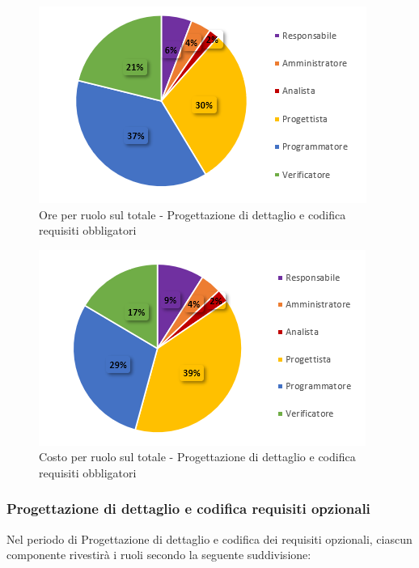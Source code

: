 \begin{figure}[H]
  \centering
  \includegraphics[scale=0.9]{immagini/ore_ruolo_reqObbligatori.png}
  \caption{Ore per ruolo sul totale - Progettazione di dettaglio e codifica requisiti obbligatori}
\end{figure}

\begin{figure}[H]
  \centering
  \includegraphics[scale=0.9]{immagini/costo_ruolo_reqObbligatori.png}
  \caption{Costo per ruolo sul totale - Progettazione di dettaglio e codifica requisiti obbligatori}
\end{figure}


\subsubsection{Progettazione di dettaglio e codifica requisiti opzionali}
Nel periodo di Progettazione di dettaglio e codifica dei requisiti opzionali, ciascun componente rivestirà i ruoli secondo la seguente suddivisione:

